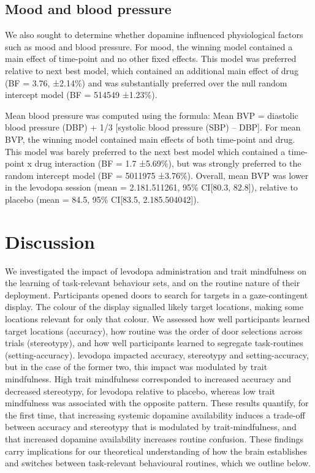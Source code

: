 \documentclass{article}
\begin{document}
\hypertarget{mood-and-blood-pressure}{%
\subsection{Mood and blood pressure}\label{mood-and-blood-pressure}}

We also sought to determine whether dopamine influenced physiological
factors such as mood and blood pressure. For mood, the winning model
contained a main effect of time-point and no other fixed effects. This
model was preferred relative to next best model, which contained an
additional main effect of drug (BF = 3.76, ±2.14\%) and was
substantially preferred over the null random intercept model (BF =
514549 ±1.23\%).

Mean blood pressure was computed using the formula: Mean BVP = diastolic
blood pressure (DBP) + 1/3 {[}systolic blood pressure (SBP) -- DBP{]}.
For mean BVP, the winning model contained main effects of both
time-point and drug. This model was barely preferred to the next best
model which contained a time-point x drug interaction (BF = 1.7
±5.69\%), but was strongly preferred to the random intercept model (BF =
5011975 ±3.76\%). Overall, mean BVP was lower in the levodopa session
(mean = 2.181.511261, 95\% CI{[}80.3, 82.8{]}), relative to placebo
(mean = 84.5, 95\% CI{[}83.5, 2.185.504042{]}).

\hypertarget{discussion}{%
\section{Discussion}\label{discussion}}

We investigated the impact of levodopa administration and trait
mindfulness on the learning of task-relevant behaviour sets, and on the
routine nature of their deployment. Participants opened doors to search
for targets in a gaze-contingent display. The colour of the display
signalled likely target locations, making some locations relevant for
only that colour. We assessed how well participants learned target
locations (accuracy), how routine was the order of door selections
across trials (stereotypy), and how well participants learned to
segregate task-routines (setting-accuracy). levodopa impacted accuracy,
stereotypy and setting-accuracy, but in the case of the former two, this
impact was modulated by trait mindfulness. High trait mindfulness
corresponded to increased accuracy and decreased stereotypy, for
levodopa relative to placebo, whereas low trait mindfulness was
associated with the opposite pattern. These results quantify, for the
first time, that increasing systemic dopamine availability induces a
trade-off between accuracy and stereotypy that is modulated by
trait-mindfulness, and that increased dopamine availability increases
routine confusion. These findings carry implications for our theoretical
understanding of how the brain establishes and switches between
task-relevant behavioural routines, which we outline below.
\end{document}
